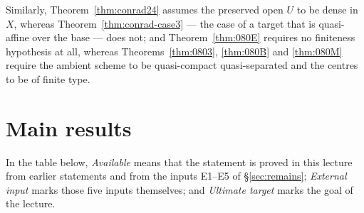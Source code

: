 \documentclass[11pt,a4paper]{article}
\theoremstyle{plain}
\theoremstyle{definition}
\theoremstyle{remark}
\newcommand{\qcqs}{quasi-compact quasi-separated}
\begin{document}
Similarly, Theorem~\ref{thm:conrad24} assumes the preserved open $U$ to be
dense in $X$, whereas Theorem~\ref{thm:conrad-case3} --- the case of a target
that is quasi-affine over the base --- does not; and
Theorem~\ref{thm:080E} requires no finiteness hypothesis at all, whereas
Theorems~\ref{thm:0803}, \ref{thm:080B} and \ref{thm:080M} require the ambient
scheme to be \qcqs{} and the centres to be of finite type.

\section{Main results}
\label{sec:summary}

In the table below, \emph{Available} means that the statement is proved in this
lecture from earlier statements and from the inputs E1--E5 of
\S\ref{sec:remains}; \emph{External input} marks those five inputs themselves;
and \emph{Ultimate target} marks the goal of the lecture.
\end{document}

